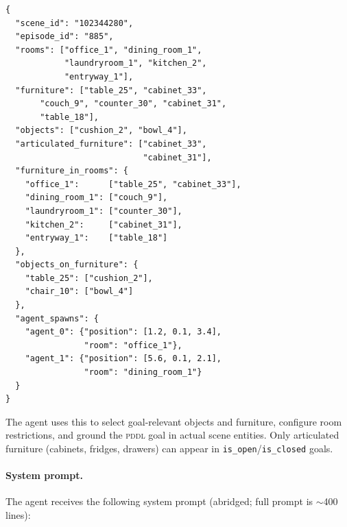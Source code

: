 \documentclass{article} %
\newcommand{\pddl}{\textsc{pddl}}
\begin{document}
\begin{lstlisting}
{
  "scene_id": "102344280",
  "episode_id": "885",
  "rooms": ["office_1", "dining_room_1",
            "laundryroom_1", "kitchen_2",
            "entryway_1"],
  "furniture": ["table_25", "cabinet_33",
       "couch_9", "counter_30", "cabinet_31",
       "table_18"],
  "objects": ["cushion_2", "bowl_4"],
  "articulated_furniture": ["cabinet_33",
                            "cabinet_31"],
  "furniture_in_rooms": {
    "office_1":      ["table_25", "cabinet_33"],
    "dining_room_1": ["couch_9"],
    "laundryroom_1": ["counter_30"],
    "kitchen_2":     ["cabinet_31"],
    "entryway_1":    ["table_18"]
  },
  "objects_on_furniture": {
    "table_25": ["cushion_2"],
    "chair_10": ["bowl_4"]
  },
  "agent_spawns": {
    "agent_0": {"position": [1.2, 0.1, 3.4],
                "room": "office_1"},
    "agent_1": {"position": [5.6, 0.1, 2.1],
                "room": "dining_room_1"}
  }
}
\end{lstlisting}

The agent uses this to select goal-relevant objects and furniture, configure room restrictions, and ground the \pddl{} goal in actual scene entities. Only articulated furniture (cabinets, fridges, drawers) can appear in \texttt{is\_open}/\texttt{is\_closed} goals.

\paragraph{System prompt.} The agent receives the following system prompt (abridged; full prompt is ${\sim}$400 lines):

\end{document}
